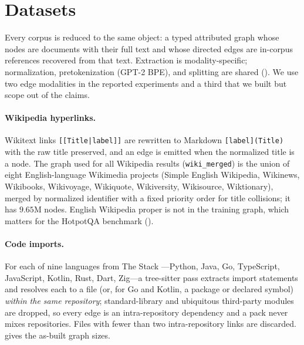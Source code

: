 \section{Datasets}
\label{sec:datasets}

Every corpus is reduced to the same object: a typed attributed graph whose nodes are
documents with their full text and whose directed edges are in-corpus references
recovered from that text. Extraction is modality-specific; normalization,
pretokenization (GPT-2 BPE), and splitting are shared (). We use
two edge modalities in the reported experiments and a third that we built but scope
out of the claims.

\paragraph{Wikipedia hyperlinks.}
Wikitext links \texttt{[[Title|label]]} are rewritten to Markdown
\texttt{[label](Title)} with the raw title preserved, and an edge is emitted when the
normalized title is a node. The graph used for all Wikipedia results
(\texttt{wiki\_merged}) is the union of eight English-language Wikimedia projects
(Simple English Wikipedia, Wikinews, Wikibooks, Wikivoyage, Wikiquote, Wikiversity,
Wikisource, Wiktionary), merged by normalized identifier with a fixed priority order
for title collisions; it has $9.65$M nodes. English Wikipedia proper is not in the
training graph, which matters for the HotpotQA benchmark ().

\paragraph{Code imports.}
For each of nine languages from The Stack \citep{kocetkov2022stack}---Python, Java,
Go, TypeScript, JavaScript, Kotlin, Rust, Dart, Zig---a tree-sitter pass extracts
import statements and resolves each to a file (or, for Go and Kotlin, a package or
declared symbol) \emph{within the same repository}; standard-library and ubiquitous
third-party modules are dropped, so every edge is an intra-repository dependency and a
pack never mixes repositories. Files with fewer than two intra-repository links are
discarded.  gives the as-built graph sizes.

